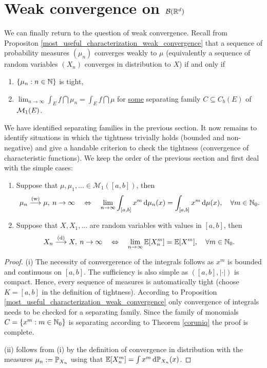 \section[Weak convergence on $\mathcal B(\R)$]{Weak convergence on $\mathcal B(\R^d)$}\label{sec:WC}
We can finally return to the question of weak convergence. Recall from Propositon \ref{most_useful_characterization_weak_convergence} that a sequence of probability measures $(\mu_n)$ converges weakly to $\mu$ (equivalently a sequence of random variables $(X_n)$ converges in distribution to $X$) if and only if
\begin{enumerate}[label=(\roman*)]
	\item $\{\mu_n:n\in\N\}$ is tight,
	\item $ \lim_{n\to\infty} \int_E f \dint \mu_n = \int_E f \dint \mu$ for \underline{some} separating family $C \subseteq C_b(E)$ of $\cM_1(E)$.
\end{enumerate}
We have identified separating families in the previous section. It now remains to identify situations in which the tightness trivially holds (bounded and non-negative) and give a handable criterion to check the tightness (convergence of characteristic functions). We keep the order of the previous section and first deal with the simple cases:
\begin{lAussageWerkzeug}
\begin{theorem}
	\begin{enumerate}[label=(\roman*)]
		\item Suppose that $\mu,\mu_1,...\in \mathcal M_1([a,b])$, then 
	\begin{align*}
		\mu_n \overset{\text{(w)}}{\longrightarrow} \mu,\: n \to \infty \quad\Leftrightarrow \quad \lim_{n\to\infty}\int_{[a,b]} x^m\dint \mu_n(x)=\int_{[a,b]} x^m\dint \mu(x),\quad \forall m\in\N_0.
	\end{align*}
	\item Suppose that $X,X_1,...$ are random variables with values in $[a,b]$, then 
	\begin{align*}
		X_n \overset{\text{(d)}}{\longrightarrow} X,\: n \to \infty \quad\Leftrightarrow \quad \lim_{n\to\infty}\E[X_n^m]=\E[X^m], \quad \forall m\in\N_0.
	\end{align*}
\end{enumerate}
\end{theorem}
\end{lAussageWerkzeug}
\begin{proof}[Proof]
	(i) The necessity of convergerence of the integrals follows as $x^m$ is bounded and continuous on $[a,b]$. The sufficiency is also simple as $([a,b],|\cdot|)$ is compact. Hence, every sequence of measures is automatically tight (choose $K=[a,b]$ in the definition of tightness). According to Proposition \ref{most_useful_characterization_weak_convergence} only convergence of integrals needs to be checked for a separating family. Since the family of monomials $C=\{x^m:m\in\N_0\}$ is separating according to Theorem \ref{coruniq} the proof is complete.\smallskip

	(ii) follows from (i) by the definition of convergence in distribution with the measures $\mu_n:=\P_{X_n}$ using that $\E[X_n^m]=\int x^m \dint \P_{X_n}(x)$.\smallskip
\end{proof}
